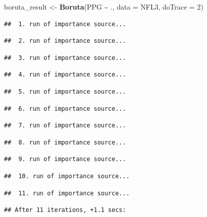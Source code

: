 \documentclass[
]{article}
\newenvironment{Shaded}{\begin{snugshade}}{\end{snugshade}}
\newcommand{\AttributeTok}[1]{\textcolor[rgb]{0.13,0.29,0.53}{#1}}
\newcommand{\DecValTok}[1]{\textcolor[rgb]{0.00,0.00,0.81}{#1}}
\newcommand{\FunctionTok}[1]{\textcolor[rgb]{0.13,0.29,0.53}{\textbf{#1}}}
\newcommand{\NormalTok}[1]{#1}
\newcommand{\OtherTok}[1]{\textcolor[rgb]{0.56,0.35,0.01}{#1}}
\newcommand{\SpecialCharTok}[1]{\textcolor[rgb]{0.81,0.36,0.00}{\textbf{#1}}}
\begin{document}
\begin{Shaded}
\begin{Highlighting}[]
\NormalTok{boruta\_result }\OtherTok{\textless{}{-}} \FunctionTok{Boruta}\NormalTok{(PPG }\SpecialCharTok{\textasciitilde{}}\NormalTok{ ., }\AttributeTok{data =}\NormalTok{ NFL3, }\AttributeTok{doTrace =} \DecValTok{2}\NormalTok{)}
\end{Highlighting}
\end{Shaded}

\begin{verbatim}
##  1. run of importance source...
\end{verbatim}

\begin{verbatim}
##  2. run of importance source...
\end{verbatim}

\begin{verbatim}
##  3. run of importance source...
\end{verbatim}

\begin{verbatim}
##  4. run of importance source...
\end{verbatim}

\begin{verbatim}
##  5. run of importance source...
\end{verbatim}

\begin{verbatim}
##  6. run of importance source...
\end{verbatim}

\begin{verbatim}
##  7. run of importance source...
\end{verbatim}

\begin{verbatim}
##  8. run of importance source...
\end{verbatim}

\begin{verbatim}
##  9. run of importance source...
\end{verbatim}

\begin{verbatim}
##  10. run of importance source...
\end{verbatim}

\begin{verbatim}
##  11. run of importance source...
\end{verbatim}

\begin{verbatim}
## After 11 iterations, +1.1 secs:
\end{verbatim}
\end{document}
